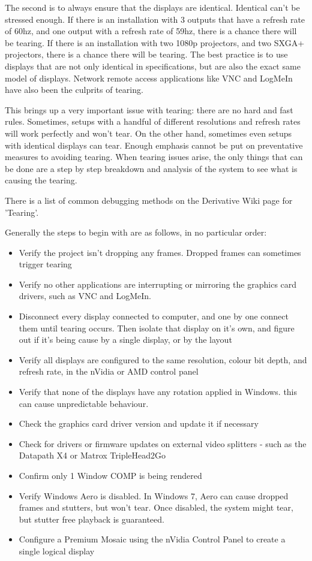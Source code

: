 \begin{fullwidth}
The second is to always ensure that the displays are identical. Identical can't be stressed enough. If there is an installation with 3 outputs that have a refresh rate of 60hz, and one output with a refresh rate of 59hz, there is a chance there will be tearing. If there is an installation with two 1080p projectors, and two SXGA+ projectors, there is a chance there will be tearing. The best practice is to use displays that are not only identical in specifications, but are also the exact same model of displays. Network remote access applications like VNC and LogMeIn have also been the culprits of tearing.

This brings up a very important issue with tearing: there are no hard and fast rules. Sometimes, setups with a handful of different resolutions and refresh rates will work perfectly and won't tear. On the other hand, sometimes even setups with identical displays can tear. Enough emphasis cannot be put on preventative measures to avoiding tearing. When tearing issues arise, the only things that can be done are a step by step breakdown and analysis of the system to see what is causing the tearing.

There is a list of common debugging methods on the Derivative Wiki page for 'Tearing'. 

Generally the steps to begin with are as follows, in no particular order:

\begin{itemize}
\item Verify the project isn't dropping any frames. Dropped frames can sometimes trigger tearing
\item Verify no other applications are interrupting or mirroring the graphics card drivers, such as VNC and LogMeIn.
\item Disconnect every display connected to computer, and one by one connect them until tearing occurs. Then isolate that display on it's own, and figure out if it's being cause by a single display, or by the layout
\item Verify all displays are configured to the same resolution, colour bit depth, and refresh rate, in the nVidia or AMD control panel
\item Verify that none of the displays have any rotation applied in Windows. this can cause unpredictable behaviour.
\item Check the graphics card driver version and update it if necessary
\item Check for drivers or firmware updates on external video splitters - such as the Datapath X4 or Matrox TripleHead2Go
\item Confirm only 1 Window COMP is being rendered
\item Verify Windows Aero is disabled. In Windows 7, Aero can cause dropped frames and stutters, but won't tear. Once disabled, the system might tear, but stutter free playback is guaranteed.
\item Configure a Premium Mosaic using the nVidia Control Panel to create a single logical display 
\end{itemize}


\end{fullwidth}
